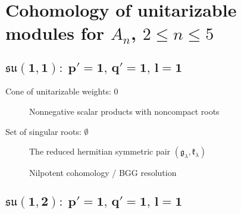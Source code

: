 \chapter[Cohomology of unitarizable modules for An, 1 < n < 6]{Cohomology of unitarizable modules for $A_n$, $2 \leq n \leq 5$}

\section[su(1,1): 1,1,1]{$\boldsymbol{\mathfrak{su}(1, 1)\!:\; p'= 1,\, q' = 1,\, l = 1}$}

Cone of unitarizable weights: $0$ \\


\begin{figure}[H]
  \centering
  \caption{Nonnegative scalar products with noncompact roots}
\end{figure}

\noindent Set of singular roots: $\emptyset$ \\

\begin{figure}[H]
  \centering
  \caption{The reduced hermitian symmetric pair $(\mathfrak{g}_\lambda, \mathfrak{k}_\lambda)$}
\end{figure}

\begin{figure}[H]
  \centering
  \caption{Nilpotent cohomology / BGG resolution}
\end{figure}

        


\section[su(1,2): 1,1,1]{$\boldsymbol{\mathfrak{su}(1, 2)\!:\; p'= 1,\, q' = 1,\, l = 1}$}

